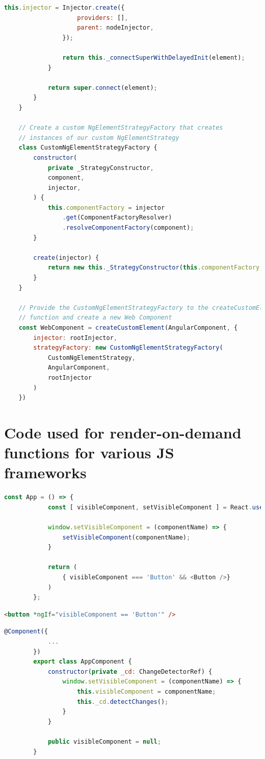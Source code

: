 \begin{lstlisting}[language={JavaScript},caption={The code for creating a Hierarchical Injector in an Angular Elements component},label={lst:appendix:hierarchical-injectors}]
				this.injector = Injector.create({
					providers: [],
					parent: nodeInjector,
				});
	
				return this._connectSuperWithDelayedInit(element);
			}
	
			return super.connect(element);
		}
	}
	
	// Create a custom NgElementStrategyFactory that creates
	// instances of our custom NgElementStrategy
	class CustomNgElementStrategyFactory {
		constructor(
			private _StrategyConstructor,
			component,
			injector,
		) {
			this.componentFactory = injector
				.get(ComponentFactoryResolver)
				.resolveComponentFactory(component);
		}
	
		create(injector) {
			return new this._StrategyConstructor(this.componentFactory, injector);
		}
	}
	
	// Provide the CustomNgElementStrategyFactory to the createCustomElement
	// function and create a new Web Component
	const WebComponent = createCustomElement(AngularComponent, {
		injector: rootInjector,
		strategyFactory: new CustomNgElementStrategyFactory(
			CustomNgElementStrategy,
			AngularComponent,
			rootInjector
		)
	})
		\end{lstlisting}

	\section{Code used for render-on-demand functions for various JS frameworks}

	\begin{lstlisting}[language={JavaScript},caption={The render-on-demand function in ReactJS},label={lst:appendix:react-set-visible}]
		const App = () => {
			const [ visibleComponent, setVisibleComponent ] = React.useState(null);
		
			window.setVisibleComponent = (componentName) => {
				setVisibleComponent(componentName);
			}
		
			return (
				{ visibleComponent === 'Button' && <Button />}
			)
		};
		\end{lstlisting}
		
		\begin{lstlisting}[language={HTML},caption={The render-on-demand function in Angular (HTML file)},label={lst:appendix:angular-set-visible-html}]
		<button *ngIf="visibleComponent == 'Button'" />
		\end{lstlisting}
		
		\begin{lstlisting}[language={JavaScript},caption={The render-on-demand function in Angular (JavaScript file)},label={lst:appendix:angular-set-visible-js}]
		@Component({
			...
		})
		export class AppComponent {
			constructor(private _cd: ChangeDetectorRef) {
				window.setVisibleComponent = (componentName) => {
					this.visibleComponent = componentName;
					this._cd.detectChanges();
				}
			}
		
			public visibleComponent = null;
		}
		\end{lstlisting}
		
